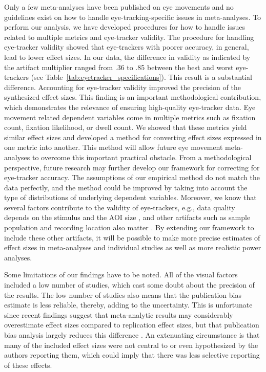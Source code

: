 Only a few meta-analyses have been published on eye movements and no guidelines exist on how to handle eye-tracking-specific issues in meta-analyses. To perform our analysis, we have developed procedures for how to handle issues related to multiple metrics and eye-tracker validity. The procedure for handling eye-tracker validity showed that eye-trackers with poorer accuracy, in general, lead to lower effect sizes. In our data, the difference in validity as indicated by the artifact multiplier ranged from .36 to .85 between the best and worst eye-trackers (see Table~\ref{tab:eyetracker_specifications}). This result is a substantial difference. Accounting for eye-tracker validity improved the precision of the synthesized effect sizes. This finding is an important methodological contribution, which demonstrates the relevance of ensuring high-quality eye-tracker data. Eye movement related dependent variables come in multiple metrics such as fixation count, fixation likelihood, or dwell count. We showed that these metrics yield similar effect sizes and developed a method for converting effect sizes expressed in one metric into another. This method will allow future eye movement meta-analyses to overcome this important practical obstacle. From a methodological perspective, future research may further develop our framework for correcting for eye-tracker accuracy. The assumptions of our empirical method do not match the data perfectly, and the method could be improved by taking into account the type of distributions of underlying dependent variables. Moreover, we know that several factors contribute to the validity of eye-trackers, e.g., data quality depends on the stimulus and the AOI size \citep{orquin2018a}, and other artifacts such as sample population and recording location also matter \citep{nystroem2013a}. By extending our framework to include these other artifacts, it will be possible to make more precise estimates of effect sizes in meta-analyses and individual studies as well as more realistic power analyses.  



Some limitations of our findings have to be noted. All of the visual factors included a low number of studies, which cast some doubt about the precision of the results. The low number of studies also means that the publication bias estimate is less reliable, thereby, adding to the uncertainty. This is unfortunate since recent findings suggest that meta-analytic results may considerably overestimate effect sizes compared to replication effect sizes, but that publication bias analysis largely reduces this difference \citep{kvarven2020}. An extenuating circumstance is that many of the included effect sizes were not central to or even hypothesized by the authors reporting them, which could imply that there was less selective reporting of these effects.  


